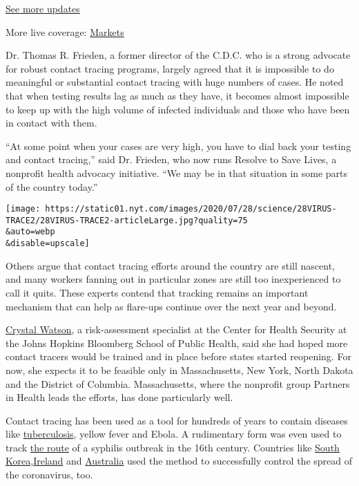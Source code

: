 \href{https://www.nytimes.com/2020/08/04/world/coronavirus-cases.html?action=click\&pgtype=Article\&state=default\&region=MAIN_CONTENT_1\&context=storylines_live_updates}{See
more updates}

More live coverage:
\href{https://www.nytimes.com/live/2020/08/04/business/stock-market-today-coronavirus?action=click\&pgtype=Article\&state=default\&region=MAIN_CONTENT_1\&context=storylines_live_updates}{Markets}

Dr. Thomas R. Frieden, a former director of the C.D.C. who is a strong
advocate for robust contact tracing programs, largely agreed that it is
impossible to do meaningful or substantial contact tracing with huge
numbers of cases. He noted that when testing results lag as much as they
have, it becomes almost impossible to keep up with the high volume of
infected individuals and those who have been in contact with them.

``At some point when your cases are very high, you have to dial back
your testing and contact tracing,'' said Dr. Frieden, who now runs
Resolve to Save Lives, a nonprofit health advocacy initiative. ``We may
be in that situation in some parts of the country today.''

\texttt{[image: https://static01.nyt.com/images/2020/07/28/science/28VIRUS-TRACE2/28VIRUS-TRACE2-articleLarge.jpg?quality=75\\\&auto=webp\\\&disable=upscale]}

Others argue that contact tracing efforts around the country are still
nascent, and many workers fanning out in particular zones are still too
inexperienced to call it quits. These experts contend that tracking
remains an important mechanism that can help as flare-ups continue over
the next year and beyond.

\href{https://www.centerforhealthsecurity.org/our-people/C\%20Watson/}{Crystal
Watson}, a risk-assessment specialist at the Center for Health Security
at the Johns Hopkins Bloomberg School of Public Health, said she had
hoped more contact tracers would be trained and in place before states
started reopening. For now, she expects it to be feasible only in
Massachusetts, New York, North Dakota and the District of Columbia.
Massachusetts, where the nonprofit group Partners in Health leads the
efforts, has done particularly well.

Contact tracing has been used as a tool for hundreds of years to contain
diseases like
\href{https://www.who.int/tb/areas-of-work/laboratory/contact-investigation/en/}{tuberculosis},
yellow fever and Ebola. A rudimentary form was even used to track
\href{https://theconversation.com/contact-tracing-how-physicians-used-it-500-years-ago-to-control-the-bubonic-plague-139248}{the
route} of a syphilis outbreak in the 16th century. Countries like
\href{https://www.forbes.com/sites/alexandrasternlicht/2020/04/30/south-koreas-widespread-testing-and-contact-tracing-lead-to-first-day-with-no-new-cases/}{South
Korea},\href{https://www.theguardian.com/world/2020/jul/20/cheap-popular-and-it-works-irelands-contact-tracing-app-success?CMP=Share_iOSApp_Other}{Ireland}
and
\href{https://www.aei.org/technology-and-innovation/a-tale-of-two-contact-tracing-apps-lessons-from-australia-and-new-zealand/}{Australia}
used the method to successfully control the spread of the coronavirus,
too.

